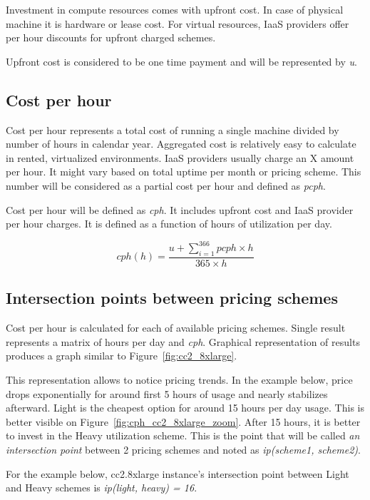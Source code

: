 \documentclass[]{final_report}
\begin{document}
Investment in compute resources comes with upfront cost. In case of physical machine it is hardware or lease cost. For virtual resources, IaaS providers offer per hour discounts for upfront charged schemes. \par
Upfront cost is considered to be one time payment and will be represented by \textit{u}. 

\subsection{Cost per hour}

Cost per hour represents a total cost of running a single machine divided by number of hours in calendar year. Aggregated cost is relatively easy to calculate in rented, virtualized environments. IaaS providers usually charge an X amount per hour. It might vary based on total uptime per month or pricing scheme. This number will be considered as a partial cost per hour and defined as \textit{pcph}. \par
Cost per hour will be defined as \textit{cph}. It includes upfront cost and IaaS provider per hour charges. It is defined as a function of hours of utilization per day.  

\begin{equation}
\label{eq:cph}
cph(h) = \frac{u + \sum_{i=1}^{366} pcph \times h}{365 \times h}
\end{equation}

\subsection{Intersection points between pricing schemes}

Cost per hour is calculated for each of available pricing schemes. Single result represents a matrix of hours per day and \textit{cph}. Graphical representation of results produces a graph similar to Figure~\ref{fig:cc2_8xlarge}. \par 
This representation allows to notice pricing trends. In the example below, price drops exponentially for around first 5 hours of usage and nearly stabilizes afterward. Light is the cheapest option for around 15 hours per day usage. This is better visible on Figure~\ref{fig:cph_cc2_8xlarge_zoom}. After 15 hours, it is better to invest in the Heavy utilization scheme. This is the point that will be called \textit{an intersection point} between 2 pricing schemes and noted as \textit{ip(scheme1, scheme2)}. \par
For the example below, cc2.8xlarge instance's intersection point between Light and Heavy schemes is \textit{ip(light, heavy) = 16}.
\end{document}
